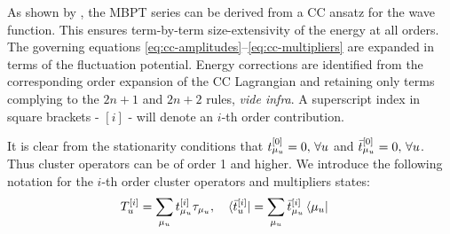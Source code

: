 As shown by \citeauthor{Koch1997-nm}, the \acrshort{MBPT} series can be
derived from a \acrshort{CC} ansatz for the wave function.
This ensures term-by-term size-extensivity of the energy at all
orders.\autocite{Helgaker2000-tz}
The governing equations
\eqref{eq:cc-amplitudes}--\eqref{eq:cc-multipliers} are expanded in
terms of the fluctuation potential. Energy corrections are identified
from the corresponding order expansion of the \acrshort{CC} Lagrangian
and retaining only terms complying to the $2n+1$ and $2n+2$ rules,
\emph{vide infra}.\autocite{Helgaker1988-to, Helgaker1989-wl, Helgaker1992-ph}
A superscript index in square brackets - $[i]$ -  will denote an $i$-th
order contribution.

It is clear from the stationarity conditions that $t_{\mu_u}^{[0]} = 0, \,\forall u$ and
$\bar{t}_{\mu_u}^{[0]} = 0, \, \forall u$.
Thus cluster operators can be of order 1 and higher. We introduce the
following notation for the $i$-th order cluster operators and
multipliers states:
\begin{alignat}{2}
  T_u^{[i]} = \sum_{\mu_u}t_{\mu_u}^{[i]}\tau_{\mu_u},
  \quad&
  \bra{\bar{t}_{u}^{[i]}} = \sum_{\mu_u}\bar{t}_{\mu_u}^{[i]}\bra{\mu_u}
\end{alignat}

